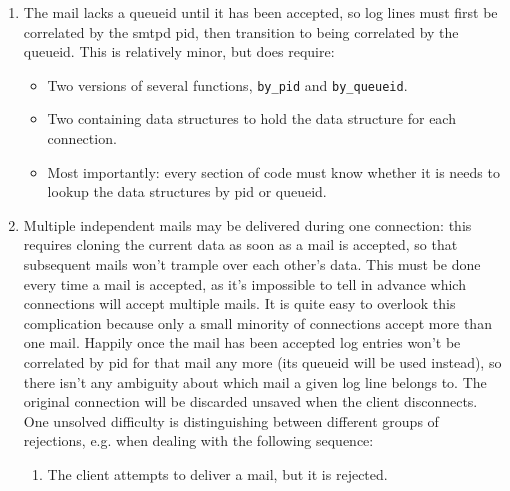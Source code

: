 \documentclass[a4paper,12pt,draft]{article}
\begin{document}
\begin{enumerate}

    \item The mail lacks a queueid until it has been accepted, so log lines
        must first be correlated by the smtpd pid, then transition to being
        correlated by the queueid.  This is relatively minor, but does
        require:

        \begin{itemize}

            \item Two versions of several functions, \texttt{by\_pid} and
                \texttt{by\_queueid}.

            \item Two containing data structures to hold the data
                structure for each connection.

            \item Most importantly: every section of code must know whether
                it is needs to lookup the data structures by pid or
                queueid.

        \end{itemize}

    \item Multiple independent mails may be delivered during one
        connection: this requires cloning the current data as soon as a
        mail is accepted, so that subsequent mails won't trample over each
        other's data.  This must be done every time a mail is accepted, as
        it's impossible to tell in advance which connections will accept
        multiple mails.  It is quite easy to overlook this complication
        because only a small minority of connections accept more than one
        mail. Happily once the mail has been accepted log entries won't be
        correlated by pid for that mail any more (its queueid will be used
        instead), so there isn't any ambiguity about which mail a given log
        line belongs to.  The original connection will be discarded unsaved
        when the client disconnects.  One unsolved difficulty is
        distinguishing between different groups of rejections, e.g. when
        dealing with the following sequence:

        \begin{enumerate}

            \item The client attempts to deliver a mail, but it is
                rejected.


\end{enumerate}
\end{enumerate}
\end{document}
